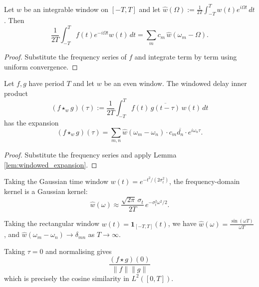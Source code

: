 \begin{lemma}\label{lem:windowed_expansion}
Let $w$ be an integrable window on $[-T, T]$ and let $\widehat{w}(\Omega) := \frac{1}{2T} \int_{-T}^{T} w(t) e^{i\Omega t}\,dt$. Then
\[
\frac{1}{2T}\int_{-T}^{T} f(t) e^{-i\Omega t} w(t)\,dt = \sum_{m} c_m\, \widehat{w}(\omega_m - \Omega).
\]
\end{lemma}

\begin{proof}
Substitute the frequency series of $f$ and integrate term by term using uniform convergence.
\end{proof}

\begin{theorem}\label{thm:window_kernel_duality}
Let $f, g$ have period $T$ and let $w$ be an even window. The windowed delay inner product
\[
(f \star_w g)(\tau) := \frac{1}{2T}\int_{-T}^{T} f(t)\, \overline{g(t - \tau)}\, w(t)\,dt
\]
has the expansion
\[
(f \star_w g)(\tau) = \sum_{m,n} \widehat{w}(\omega_m - \omega_n) \cdot c_m \overline{d_n} \cdot e^{i\omega_n \tau}.
\]
\end{theorem}

\begin{proof}
Substitute the frequency series and apply Lemma \ref{lem:windowed_expansion}.
\end{proof}

\begin{corollary}\label{cor:gaussian_window_kernel}
Taking the Gaussian time window $w(t) = e^{-t^2/(2\sigma_t^2)}$, the frequency-domain kernel is a Gaussian kernel:
\[
\widehat{w}(\omega) \approx \frac{\sqrt{2\pi}\,\sigma_t}{2T}\, e^{-\sigma_t^2 \omega^2 / 2}.
\]
\end{corollary}

\begin{corollary}\label{cor:classical_limit}
Taking the rectangular window $w(t) = \mathbf{1}_{[-T,T]}(t)$, we have $\widehat{w}(\omega) = \frac{\sin(\omega T)}{\omega T}$, and $\widehat{w}(\omega_m - \omega_n) \to \delta_{mn}$ as $T \to \infty$.
\end{corollary}

\begin{corollary}\label{cor:zero_delay_cosine}
Taking $\tau = 0$ and normalising gives
\[
\frac{(f \star g)(0)}{\|f\| \|g\|}
\]
which is precisely the cosine similarity in $L^2([0,T])$.
\end{corollary}

